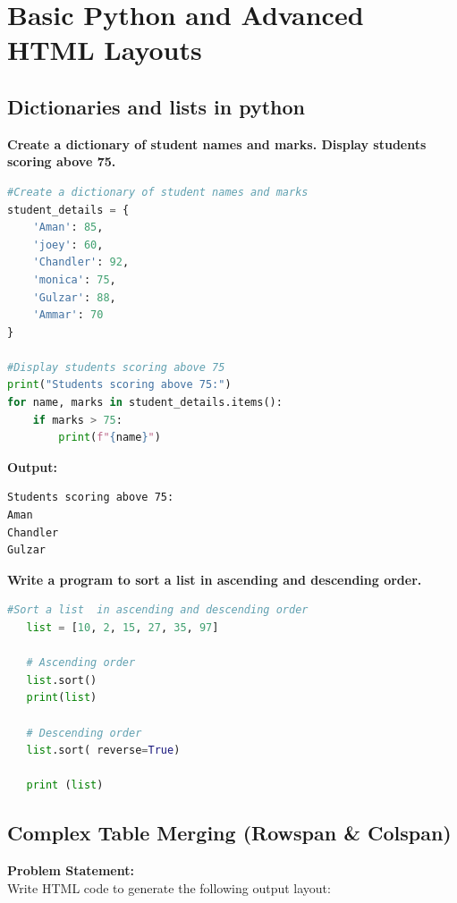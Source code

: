 \documentclass[a4paper,12pt]{article}
\begin{document}
\section{Basic Python and Advanced HTML Layouts}


\subsection{Dictionaries and lists in python}
\textbf{Create a dictionary of student names and marks. Display students scoring above 75. }
\begin{lstlisting}[language=Python, caption={ Dictionary.}]
#Create a dictionary of student names and marks
student_details = {
    'Aman': 85,
    'joey': 60,
    'Chandler': 92,
    'monica': 75,
    'Gulzar': 88,
    'Ammar': 70
}

#Display students scoring above 75
print("Students scoring above 75:")
for name, marks in student_details.items():
    if marks > 75:
        print(f"{name}")
\end{lstlisting}
\vspace{0.5cm}
\textbf{Output:}
\begin{lstlisting}[language=bash]
Students scoring above 75:
Aman
Chandler
Gulzar
\end{lstlisting}



\textbf{Write a program to sort a list in ascending and descending order.}
\begin{lstlisting}[language = Python, caption = {Sorting Lists}]
   #Sort a list  in ascending and descending order
   list = [10, 2, 15, 27, 35, 97]

   # Ascending order
   list.sort()
   print(list)

   # Descending order
   list.sort( reverse=True)

   print (list)    
\end{lstlisting}

\subsection{Complex Table Merging (Rowspan \& Colspan)}

\textbf{Problem Statement:} \\
Write HTML code to generate the following output layout:
\end{document}
